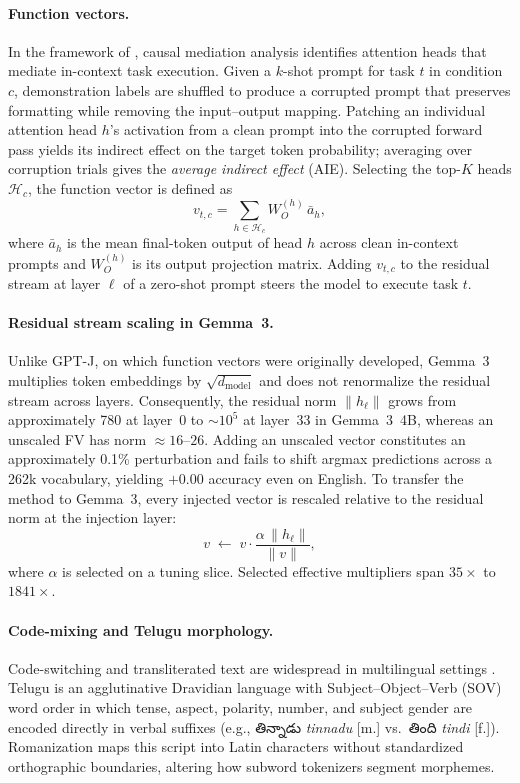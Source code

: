 \documentclass[11pt]{article}
\newcommand{\telugufont}{}
\newcommand{\tel}[1]{{\telugufont #1}}
\begin{document}
\paragraph{Function vectors.}
In the framework of \citet{todd2024function}, causal mediation analysis
\cite{pearl2001direct,vig2020causal} identifies attention heads that mediate
in-context task execution. Given a $k$-shot prompt for task $t$ in condition
$c$, demonstration labels are shuffled to produce a corrupted prompt that
preserves formatting while removing the input--output mapping. Patching an
individual attention head $h$'s activation from a clean prompt into the
corrupted forward pass yields its indirect effect on the target token
probability; averaging over corruption trials gives the \emph{average indirect
effect} (AIE). Selecting the top-$K$ heads $\mathcal{H}_c$, the function vector
is defined as
\begin{equation}
  v_{t,c} = \sum_{h \in \mathcal{H}_c} W_O^{(h)}\,\bar{a}_h,
  \label{eq:fv}
\end{equation}
where $\bar{a}_h$ is the mean final-token output of head $h$ across clean
in-context prompts and $W_O^{(h)}$ is its output projection matrix. Adding
$v_{t,c}$ to the residual stream at layer $\ell$ of a zero-shot prompt steers
the model to execute task $t$.

\paragraph{Residual stream scaling in Gemma~3.}
Unlike GPT-J, on which function vectors were originally developed, Gemma~3
multiplies token embeddings by $\sqrt{d_{\text{model}}}$ and does not
renormalize the residual stream across layers. Consequently, the residual norm
$\|h_\ell\|$ grows from approximately 780 at layer~0 to ${\sim}10^5$ at
layer~33 in Gemma~3~4B, whereas an unscaled FV has norm ${\approx}16$--$26$.
Adding an unscaled vector constitutes an approximately 0.1\% perturbation and
fails to shift argmax predictions across a 262k vocabulary, yielding $+0.00$
accuracy even on English. To transfer the method to Gemma~3, every injected
vector is rescaled relative to the residual norm at the injection layer:
\begin{equation}
  v \;\leftarrow\; v \cdot \frac{\alpha\,\|h_\ell\|}{\|v\|},
  \label{eq:scale}
\end{equation}
where $\alpha$ is selected on a tuning slice. Selected effective multipliers
span $35\times$ to $1841\times$.

\paragraph{Code-mixing and Telugu morphology.}
Code-switching and transliterated text are widespread in multilingual settings
\cite{sitaram2019survey,khanuja2020gluecos}. Telugu is an agglutinative
Dravidian language with Subject--Object--Verb (SOV) word order in which tense,
aspect, polarity, number, and subject gender are encoded directly in verbal
suffixes (e.g., \tel{తిన్నాడు} \emph{tinnadu} [m.] vs.\ \tel{తింది}
\emph{tindi} [f.]). Romanization maps this script into Latin characters without
standardized orthographic boundaries, altering how subword tokenizers segment
morphemes.
\end{document}
